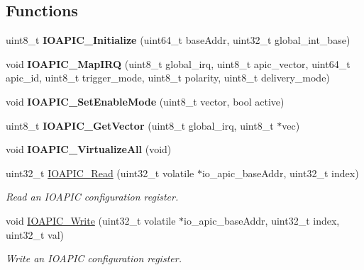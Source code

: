\subsection*{Functions}
\begin{DoxyCompactItemize}
\item 
uint8\+\_\+t {\bfseries I\+O\+A\+P\+I\+C\+\_\+\+Initialize} (uint64\+\_\+t base\+Addr, uint32\+\_\+t global\+\_\+int\+\_\+base)\hypertarget{group__ioapic__driver_gaf4474a38de81efadf90a3a5dcc6f8c36}{}\label{group__ioapic__driver_gaf4474a38de81efadf90a3a5dcc6f8c36}

\item 
void {\bfseries I\+O\+A\+P\+I\+C\+\_\+\+Map\+I\+RQ} (uint8\+\_\+t global\+\_\+irq, uint8\+\_\+t apic\+\_\+vector, uint64\+\_\+t apic\+\_\+id, uint8\+\_\+t trigger\+\_\+mode, uint8\+\_\+t polarity, uint8\+\_\+t delivery\+\_\+mode)\hypertarget{group__ioapic__driver_ga5e4d78aa2c907bc93705b28059e6e4a7}{}\label{group__ioapic__driver_ga5e4d78aa2c907bc93705b28059e6e4a7}

\item 
void {\bfseries I\+O\+A\+P\+I\+C\+\_\+\+Set\+Enable\+Mode} (uint8\+\_\+t vector, bool active)\hypertarget{group__ioapic__driver_gac5221e30605a6c6af53ca229ebf31075}{}\label{group__ioapic__driver_gac5221e30605a6c6af53ca229ebf31075}

\item 
uint8\+\_\+t {\bfseries I\+O\+A\+P\+I\+C\+\_\+\+Get\+Vector} (uint8\+\_\+t global\+\_\+irq, uint8\+\_\+t $\ast$vec)\hypertarget{group__ioapic__driver_gad157f506506fbfa003f9374d2bc416db}{}\label{group__ioapic__driver_gad157f506506fbfa003f9374d2bc416db}

\item 
void {\bfseries I\+O\+A\+P\+I\+C\+\_\+\+Virtualize\+All} (void)\hypertarget{group__ioapic__driver_ga8372078d6ae0621377a30d25d52771cb}{}\label{group__ioapic__driver_ga8372078d6ae0621377a30d25d52771cb}

\item 
uint32\+\_\+t \hyperlink{group__ioapic__driver_gafbbecbb604eb53ebd03c05f38e811215}{I\+O\+A\+P\+I\+C\+\_\+\+Read} (uint32\+\_\+t volatile $\ast$io\+\_\+apic\+\_\+base\+Addr, uint32\+\_\+t index)
\begin{DoxyCompactList}\small\item\em Read an I\+O\+A\+P\+IC configuration register. \end{DoxyCompactList}\item 
void \hyperlink{group__ioapic__driver_gadc1df43ab4f7ea0081be5d730261500b}{I\+O\+A\+P\+I\+C\+\_\+\+Write} (uint32\+\_\+t volatile $\ast$io\+\_\+apic\+\_\+base\+Addr, uint32\+\_\+t index, uint32\+\_\+t val)
\begin{DoxyCompactList}\small\item\em Write an I\+O\+A\+P\+IC configuration register. \end{DoxyCompactList}\end{DoxyCompactItemize}


